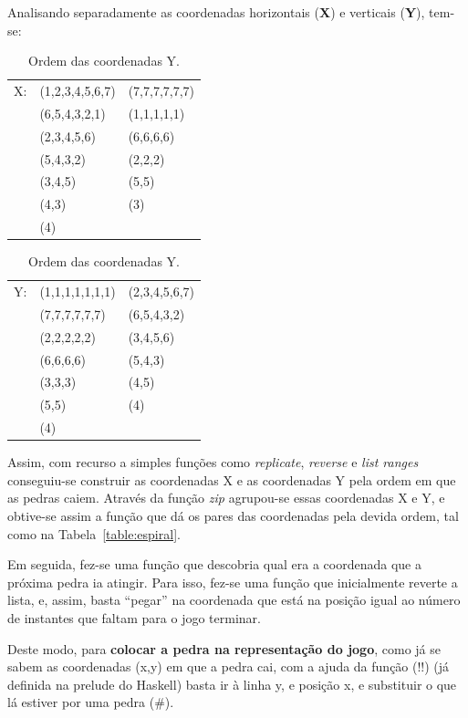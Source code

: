 \documentclass[a4paper]{article}
\begin{document}
Analisando separadamente as coordenadas horizontais (\textbf{X}) e verticais (\textbf{Y}), tem-se:

\begin{table}[!htb] 
\begin{minipage}[b]{0.40\linewidth}
\begin{tabular}[c]{cll}
X: & (1,2,3,4,5,6,7) & (7,7,7,7,7,7) \\ \
  & (6,5,4,3,2,1) & (1,1,1,1,1) \\
  & (2,3,4,5,6) & (6,6,6,6) \\
  & (5,4,3,2) & (2,2,2) \\ 
  & (3,4,5) & (5,5) \\
  & (4,3) & (3) \\
  & (4)
 \end{tabular}
\caption{Ordem das coordenadas X.}
\label{table:espiralx}
\end{minipage} \hfill 
\begin{minipage}[b]{0.40\linewidth} 
\begin{tabular}[c]{cll}
 Y: & (1,1,1,1,1,1,1) & (2,3,4,5,6,7) \\
  & (7,7,7,7,7,7) & (6,5,4,3,2) \\
  & (2,2,2,2,2) & (3,4,5,6) \\
  & (6,6,6,6) & (5,4,3) \\ 
  & (3,3,3) & (4,5) \\
  & (5,5) & (4) \\
  & (4) 
 \end{tabular}
\caption{Ordem das coordenadas Y.}
\label{table:espiraly}
\end{minipage}
\end{table}

Assim, com recurso a simples funções como \textit{replicate}, \textit{reverse} e 
\textit{list ranges} conseguiu-se construir as coordenadas X e as coordenadas Y 
pela ordem em que as pedras caiem. Através da função \textit{zip} agrupou-se essas 
coordenadas X e Y, e obtive-se assim a função que dá os pares das coordenadas 
pela devida ordem, tal como na Tabela~\ref{table:espiral}.

Em seguida, fez-se uma função que descobria qual era a coordenada que a 
próxima pedra ia atingir. Para isso, fez-se uma função que inicialmente reverte a lista, 
e, assim, basta “pegar” na coordenada que está na posição igual ao número de 
instantes que faltam para o jogo terminar.

Deste modo, para \textbf{colocar a pedra na representação do jogo}, como já se sabem as 
coordenadas (x,y) em que a pedra cai, com a ajuda da função (!!) (já definida na 
prelude do Haskell) basta ir à linha y, e posição x, e substituir o que lá estiver por uma
pedra (\#).
\end{document}
